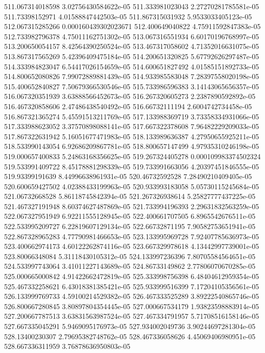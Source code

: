 {511.067314018598 3.02756430584622e-05
511.333981023043 2.27270281785581e-05
511.73398152971 4.01588847442503e-05
511.867315031932 5.9533033405123e-05
512.067315285266 0.000160439302023671
512.400649040822 4.75911592847383e-05
512.733982796378 4.75011162751302e-05
513.067316551934 6.60170196768997e-05
513.200650054157 8.42564390250524e-05
513.467317058602 4.71352016631075e-05
513.867317565269 5.42396409475184e-05
514.200651320825 5.67792626297487e-05
514.333984823047 6.54417026154659e-05
514.600651827492 4.01585151892733e-05
514.800652080826 7.99072889881439e-05
514.933985583048 7.28397558020198e-05
515.400652840827 7.50679366530546e-05
515.733986596383 3.14143065656357e-05
516.067320351939 3.63888566452673e-05
516.267320605273 2.2387890592892e-05
516.467320858606 2.47486438540492e-05
516.66732111194 2.6004742734458e-05
516.867321365274 5.45591513211769e-05
517.133988369719 3.73358334931066e-05
517.333988623052 3.37570898088141e-05
517.667322378608 7.96482229209033e-05
517.867322631942 5.16051677471983e-05
518.133989636387 4.27950655925211e-05
518.533990143054 6.92686209867781e-05
518.800657147499 4.97935310246198e-05
519.000657400833 5.24863168356625e-05
519.267324405278 0.000109983374502324
519.533991409722 8.45178881298339e-05
519.733991663056 4.20397451846555e-05
519.93399191639 8.44996638961931e-05
520.46732592528 7.28490210409405e-05
520.600659427502 4.02388433199963e-05
520.933993183058 5.05730115245684e-05
521.06732668528 5.86118745842394e-05
521.267326938614 5.25827777437225e-05
521.467327191948 8.60374627487869e-05
521.733994196393 2.29631832563259e-05
522.067327951949 6.92211555128945e-05
522.400661707505 6.8965542676511e-05
522.533995209727 6.22819607129134e-05
522.66732871195 7.90582753651941e-05
522.867328965283 4.77790981466653e-05
523.133995969728 7.92407785636973e-05
523.400662974173 4.60122262874116e-05
523.667329978618 4.13442997739001e-05
523.80066348084 5.31118430105312e-05
524.133997236396 7.80705584564651e-05
524.533997743064 3.41011227143689e-05
524.86733149862 2.77806070670285e-05
525.000665000842 4.91422662472819e-05
525.333998756398 6.48404612959354e-05
525.467332258621 6.43018381385421e-05
525.933999516399 7.17204105356561e-05
526.133999769733 4.59100214529382e-05
526.467333525289 3.89222540865746e-05
526.800667280845 3.80897804354445e-05
527.000667534179 1.93823598883914e-05
527.200667787513 3.63831563987524e-05
527.467334791957 5.71708516158146e-05
527.667335045291 5.9469095176973e-05
527.934002049736 3.90244697281304e-05
528.13400230307 2.79695382748762e-05
528.467336058626 4.45069406980951e-05
528.667336311959 3.76878636950803e-05
}
